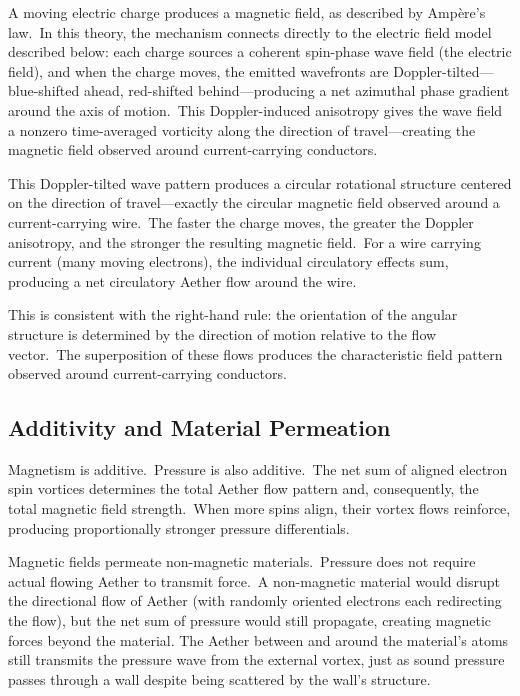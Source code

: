 ﻿\documentclass[12pt,letterpaper]{article}
\begin{document}
A moving electric charge produces a magnetic field, as described by Amp\`ere's law.\ In this
theory, the mechanism connects directly to the electric field model described below: each
charge sources a coherent spin-phase wave field (the electric field), and when the
charge moves, the emitted wavefronts are Doppler-tilted---blue-shifted ahead, red-shifted
behind---producing a net azimuthal phase gradient around the axis of motion.\ This
Doppler-induced anisotropy gives the wave field a nonzero time-averaged vorticity along
the direction of travel---creating the magnetic field observed around current-carrying
conductors.

This Doppler-tilted wave pattern produces a circular rotational structure centered on
the direction of travel---exactly the circular magnetic field observed around a
current-carrying wire.\ The faster the charge moves, the greater the Doppler
anisotropy, and the stronger the resulting magnetic field.\ For a wire carrying
current (many moving electrons), the individual circulatory effects sum, producing a net
circulatory Aether flow around the wire.

This is consistent with the right-hand rule: the orientation of the angular structure
is determined by the direction of motion relative to the flow vector.\ The superposition
of these flows produces the characteristic field pattern observed around current-carrying
conductors.


\subsection{Additivity and Material Permeation}

Magnetism is additive.\ Pressure is also additive.\ The net sum of aligned electron spin
vortices determines the total Aether flow pattern and, consequently, the total magnetic
field strength.\ When more spins align, their vortex flows reinforce, producing
proportionally stronger pressure differentials.

Magnetic fields permeate non-magnetic materials.\ Pressure does not require actual
flowing Aether to transmit force.\ A non-magnetic material would disrupt the directional
flow of Aether (with randomly oriented electrons each redirecting the flow), but the
net sum of pressure would still propagate, creating magnetic forces beyond the material.
The Aether between and around the material's atoms still transmits the pressure wave from
the external vortex, just as sound pressure passes through a wall despite being scattered
by the wall's structure.
\end{document}

